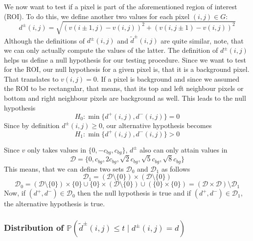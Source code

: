 \documentclass[a4paper,12pt]{article}
\theoremstyle{plain}
\theoremstyle{definition}
\theoremstyle{remark}
\begin{document}
	We now want to test if a pixel is part of the aforementioned region of interest (ROI). To do this, we define another two values for each pixel $(i, j) \in G$:
	\begin{equation}\label{d}
		d^\pm(i, j) = \sqrt{(v(i \pm 1, j) - v(i, j))^2 + (v(i, j \pm 1) - v(i, j))^2}
	\end{equation}
	Although the definitions of $d^\pm(i, j)$ and $\tilde{d}^\pm(i, j)$ are quite similar, note, that we can only actually compute the values of the latter. The definition of $d^\pm(i, j)$ helps us define a null hypothesis for our testing procedure. Since we want to test for the ROI, our null hypothesis for a given pixel is, that it is a background pixel. That translates to $v(i, j) = 0$. If a pixel is background and since we assumed the ROI to be rectangular, that means, that its top and left neighbour pixels or bottom and right neighbour pixels are background as well. This leads to the null hypothesis
	\begin{equation}
		H_0 : \min\{ d^+(i, j), d^-(i, j) \} = 0
	\end{equation}
	Since by definition $d^\pm(i, j) \geq 0$, our alternative hypothesis becomes
	\begin{equation}
		H_1 : \min\{ d^+(i, j), d^-(i, j) \} > 0
	\end{equation}
	
	Since $v$ only takes values in $\{ 0, -c_{bg}, c_{bg} \}$, $d^\pm$ also can only attain values in
	\begin{equation*}
		\mathcal{D} = \{ 0, c_{bg}, 2 c_{bg}, \sqrt{2} c_{bg}, \sqrt{5} c_{bg}, \sqrt{8} c_{bg} \}
	\end{equation*}
	This means, that we can define two sets $\mathcal{D}_0$ and $\mathcal{D}_1$ as follows
	\begin{equation*}
		\mathcal{D}_1 = ( \mathcal{D} \setminus \{ 0 \} ) \times ( \mathcal{D} \setminus \{ 0 \} )
	\end{equation*}
	\begin{equation*}
		\mathcal{D}_0 = ( \mathcal{D} \setminus \{ 0 \} ) \times \{ 0 \} \cup \{ 0 \} \times ( \mathcal{D} \setminus \{ 0 \} ) \cup ( \{ 0 \} \times \{ 0 \} ) = ( \mathcal{D} \times \mathcal{D} ) \setminus \mathcal{D}_1
	\end{equation*}
	Now, if $(d^+, d^-) \in \mathcal{D}_0$ then the null hypothesis is true and if $(d^+, d^-) \in \mathcal{D}_1$, the alternative hypothesis is true.
	
	\subsubsection{Distribution of $\mathbb{P}(\tilde{d}^\pm(i, j) \leq t \mid d^\pm(i, j) = d)$}
	
\end{document}
